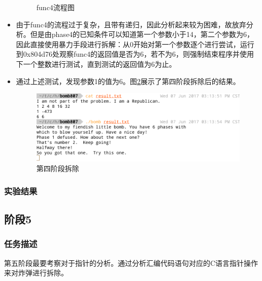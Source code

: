 \begin{itemize}
\begin{figure}[H]
			\caption{func4流程图}
			\label{fig:fig8}
		\end{figure}
	\item 由于func4的流程过于复杂，且带有递归，因此分析起来较为困难，故放弃分析。但是由phase4的已知条件可以知道第一个参数小于14，第二个参数为6，因此直接使用暴力手段进行拆解：从0开始对第一个参数逐个进行尝试，运行到0x804d76处观察func4的返回值是否为6，若不为6，则强制结束程序并使用下一个整数进行测试，直到测试的返回值为6为止。
	\item 通过上述测试，发现参数1的值为6。图\ref{fig:fig9}展示了第四阶段拆除后的结果。
		\begin{figure}[H]
			\centering
			\includegraphics[width=0.95\linewidth]{resources/fig9.png}
			\caption{第四阶段拆除}
			\label{fig:fig9}
		\end{figure}
\end{itemize}

\subsubsection{实验结果}

\subsection{阶段5}
\subsubsection{任务描述}
第五阶段最要考察对于指针的分析。通过分析汇编代码语句对应的C语言指针操作来对炸弹进行拆除。

